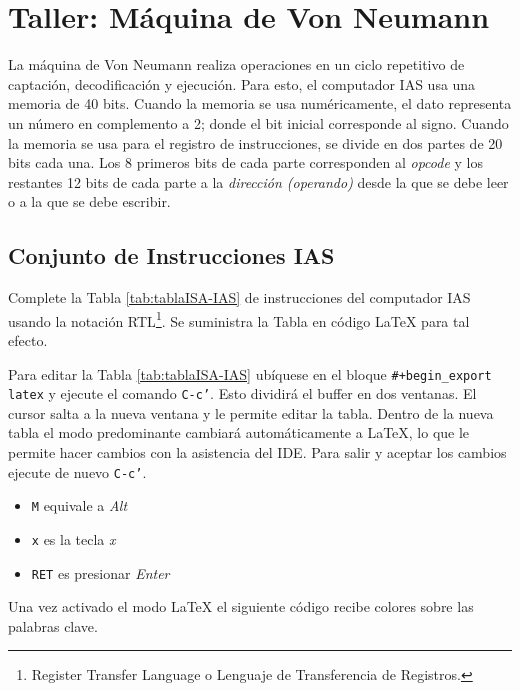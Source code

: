 \documentclass{article}
\begin{document}
\section{Taller: Máquina de Von Neumann}
\label{sec:orgde5b469}

La máquina de Von Neumann realiza operaciones en un ciclo repetitivo de
\alert{captación}, \alert{decodificación} y \alert{ejecución}. Para esto, el computador
IAS usa una memoria de 40 bits. Cuando la memoria se usa
numéricamente, el dato representa un número en complemento a 2; donde
el bit inicial corresponde al signo. Cuando la memoria se usa para el
registro de instrucciones, se divide en dos partes de 20 bits cada una. Los 8
primeros bits de cada parte corresponden al \emph{opcode} y los restantes
12 bits de cada parte a la \emph{dirección (operando)} desde la que se debe
leer o a la que se debe escribir.

\subsection{Conjunto de Instrucciones IAS}
\label{sec:orgccfd637}

Complete la Tabla \ref{tab:tablaISA-IAS}  de instrucciones del computador IAS
\autocite[p.47]{stallings2006esp} usando la notación RTL\footnote{Register Transfer Language o Lenguaje de Transferencia de Registros.}. Se suministra
la Tabla en código \LaTeX{} para tal efecto.

Para editar la Tabla \ref{tab:tablaISA-IAS} ubíquese en
el bloque \texttt{\#+begin\_export latex} y ejecute el comando \texttt{C-c'}. Esto
dividirá el buffer en dos ventanas. El cursor salta a la nueva ventana
y le permite editar la tabla. Dentro de la nueva tabla el modo
predominante cambiará automáticamente a \LaTeX, lo que le permite
hacer cambios con la asistencia del IDE. Para salir y aceptar los
cambios ejecute de nuevo \texttt{C-c'}.

\begin{itemize}
\item \texttt{M} equivale a \emph{Alt}
\item \texttt{x} es la tecla \emph{x}
\item \texttt{RET} es presionar \emph{Enter}
\end{itemize}

Una vez activado el modo \LaTeX{} el siguiente código recibe colores
sobre las palabras clave.
\end{document}
